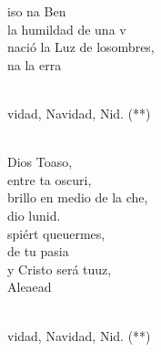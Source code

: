 \documentclass[12pt]{article}
\begin{document}
\begin{multicols*}{2}
\begin{cancion}
	iso na Ben  \\
	la humildad de una v\\
	nació la Luz de losombres, \\
	na    la erra \\\jump\\
	\begin{chorus}%
	vidad, Navidad, Nid. (**)\\
	\end{chorus}%
	\jump\\
	 Dios Toaso, \\
	entre ta oscuri,\\
	brillo en medio de la che,\\
	dio  lunid.\\
	spiért queuermes, \\
	 de tu pasia\\
	y Cristo será tuuz, \\
	Aleaead\\\jump\\
	\begin{chorus}%
	vidad, Navidad, Nid. (**)\\
	\end{chorus}%
	\jump\\
\end{cancion}%


\end{multicols*}
\end{document}
